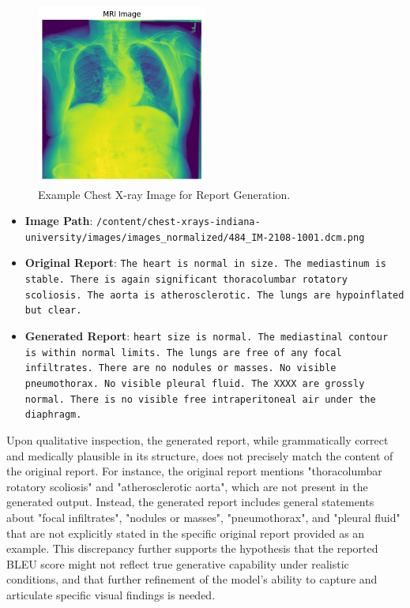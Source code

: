 \documentclass[a4paper, 12pt]{article}
\begin{document}
\begin{itemize}
\begin{figure}[H]
    \centering
    \includegraphics[width=0.5\textwidth]{output.png} %
    \caption{Example Chest X-ray Image for Report Generation.}
    \label{fig:example_xray}
\end{figure}

\begin{itemize}
    \item \textbf{Image Path}: \texttt{/content/chest-xrays-indiana-university/images/images\_normalized/484\_IM-2108-1001.dcm.png}
    \item \textbf{Original Report}: \texttt{The heart is normal in size. The mediastinum is stable. There is again significant thoracolumbar rotatory scoliosis. The aorta is atherosclerotic. The lungs are hypoinflated but clear.}
    \item \textbf{Generated Report}: \texttt{heart size is normal. The mediastinal contour is within normal limits. The lungs are free of any focal infiltrates. There are no nodules or masses. No visible pneumothorax. No visible pleural fluid. The XXXX are grossly normal. There is no visible free intraperitoneal air under the diaphragm.}
\end{itemize}

Upon qualitative inspection, the generated report, while grammatically correct and medically plausible in its structure, does not precisely match the content of the original report. For instance, the original report mentions "thoracolumbar rotatory scoliosis" and "atherosclerotic aorta", which are not present in the generated output. Instead, the generated report includes general statements about "focal infiltrates", "nodules or masses", "pneumothorax", and "pleural fluid" that are not explicitly stated in the specific original report provided as an example. This discrepancy further supports the hypothesis that the reported BLEU score might not reflect true generative capability under realistic conditions, and that further refinement of the model's ability to capture and articulate specific visual findings is needed.


\end{itemize}
\end{document}
